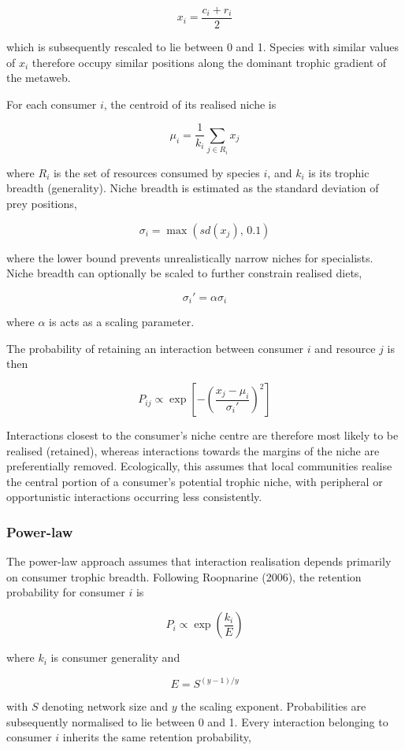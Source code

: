 \documentclass[
]{article}
\begin{document}
\[ 
x_i = \frac{c_i + r_i}{2}
\]

which is subsequently rescaled to lie between 0 and 1. Species with
similar values of \(x_i\) therefore occupy similar positions along the
dominant trophic gradient of the metaweb.

For each consumer \(i\), the centroid of its realised niche is

\[
\mu_i = \frac{1}{k_i}\sum_{j \in R_i} x_j
\]

where \(R_i\) is the set of resources consumed by species \(i\), and
\(k_i\) is its trophic breadth (generality). Niche breadth is estimated
as the standard deviation of prey positions,

\[
\sigma_i = \max\left(sd(x_j),\,0.1\right)
\]

where the lower bound prevents unrealistically narrow niches for
specialists. Niche breadth can optionally be scaled to further constrain
realised diets,

\[
\sigma_i' = \alpha \sigma_i
\]

where \(\alpha\) is acts as a scaling parameter.

The probability of retaining an interaction between consumer \(i\) and
resource \(j\) is then

\[
P_{ij} \propto \exp\left[-\left(\frac{x_j-\mu_i}{\sigma_i'}\right)^2\right]
\]

Interactions closest to the consumer's niche centre are therefore most
likely to be realised (retained), whereas interactions towards the
margins of the niche are preferentially removed. Ecologically, this
assumes that local communities realise the central portion of a
consumer's potential trophic niche, with peripheral or opportunistic
interactions occurring less consistently.

\subsubsection{Power-law}\label{power-law}

The power-law approach assumes that interaction realisation depends
primarily on consumer trophic breadth. Following Roopnarine (2006), the
retention probability for consumer \(i\) is

\[
P_i \propto \exp\left(\frac{k_i}{E}\right)
\]

where \(k_i\) is consumer generality and

\[
E = S^{(y-1)/y}
\]

with \(S\) denoting network size and \(y\) the scaling exponent.
Probabilities are subsequently normalised to lie between 0 and 1. Every
interaction belonging to consumer \(i\) inherits the same retention
probability,
\end{document}
